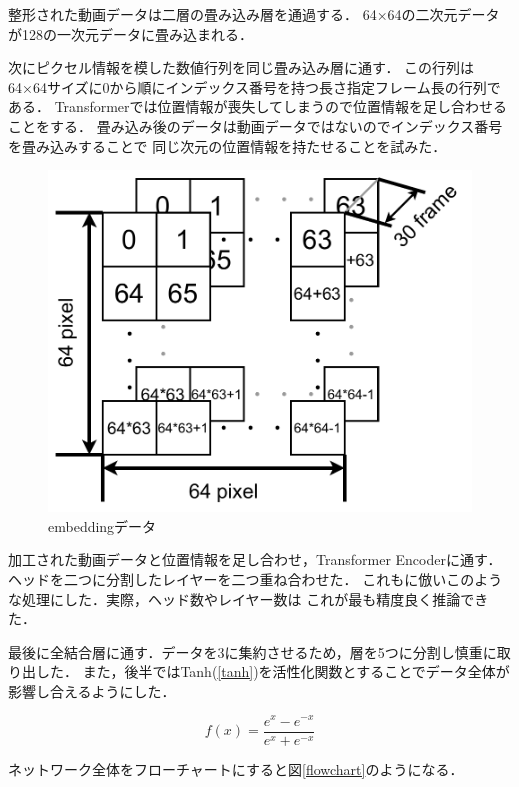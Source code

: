 整形された動画データは二層の畳み込み層を通過する．
64×64の二次元データが128の一次元データに畳み込まれる．

次にピクセル情報を模した数値行列を同じ畳み込み層に通す．
この行列は64×64サイズに0から順にインデックス番号を持つ長さ指定フレーム長の行列である．
Transformerでは位置情報が喪失してしまうので位置情報を足し合わせることをする．
畳み込み後のデータは動画データではないのでインデックス番号を畳み込みすることで
同じ次元の位置情報を持たせることを試みた．

\begin{figure}[b]
  \begin{center}
    \includegraphics[width=120mm]{images/chart/embedding.pdf}
  \end{center}
  \caption{embeddingデータ}
  \label{embedding}
\end{figure}

加工された動画データと位置情報を足し合わせ，Transformer Encoderに通す．
ヘッドを二つに分割したレイヤーを二つ重ね合わせた．
これも\cite{vivit}に倣いこのような処理にした．実際，ヘッド数やレイヤー数は
これが最も精度良く推論できた．
\clearpage

最後に全結合層に通す．データを3に集約させるため，層を5つに分割し慎重に取り出した．
また，後半ではTanh(\ref{tanh})を活性化関数とすることでデータ全体が影響し合えるようにした．

\begin{equation}
  f(x) = \frac{e^x - e^{-x}}{e^x + e^{-x}}
  \label{tanh}
\end{equation}

ネットワーク全体をフローチャートにすると図\ref{flowchart}のようになる．

